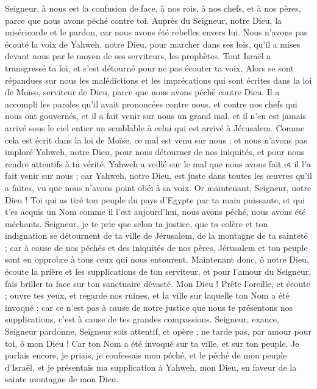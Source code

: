 \begin{multicols}{2}
Seigneur, à nous est la confusion de face, à nos rois, à nos chefs, et à nos pères, parce que nous avons péché contre toi.
Auprès du Seigneur, notre Dieu, la miséricorde et le pardon, car nous avons été rebelles envers lui.
Nous n'avons pas écouté la voix de Yahweh, notre Dieu, pour marcher dans ses lois, qu'il a mises devant nous par le moyen de ses serviteurs, les prophètes.
Tout Israël a transgressé ta loi, et s’est détourné pour ne pas écouter ta voix. Alors se sont répandues sur nous les malédictions et les imprécations qui sont écrites dans la loi de Moïse, serviteur de Dieu, parce que nous avons péché contre Dieu.
Il a accompli les paroles qu'il avait prononcées contre nous, et contre nos chefs qui nous ont gouvernés, et il a fait venir sur nous un grand mal, et il n’en est jamais arrivé sous le ciel entier un semblable à celui qui est arrivé à Jérusalem.
Comme cela est écrit dans la loi de Moïse, ce mal est venu sur nous ; et nous n'avons pas imploré Yahweh, notre Dieu, pour nous détourner de nos iniquités, et pour nous rendre attentifs à ta vérité.
Yahweh a veillé sur le mal que nous avons fait et il l'a fait venir sur nous ; car Yahweh, notre Dieu, est juste dans toutes les œuvres qu'il a faites, vu que nous n'avons point obéi à sa voix.
Or maintenant, Seigneur, notre Dieu ! Toi qui as tiré ton peuple du pays d'Egypte par ta main puissante, et qui t'es acquis un Nom comme il l’est aujourd'hui, nous avons péché, nous avons été méchants.
Seigneur, je te prie que selon ta justice, que ta colère et ton indignation se détournent de ta ville de Jérusalem, de la montagne de ta sainteté ; car à cause de nos péchés et des iniquités de nos pères, Jérusalem et ton peuple sont en opprobre à tous ceux qui nous entourent.
Maintenant donc, ô notre Dieu, écoute la prière et les supplications de ton serviteur, et pour l'amour du Seigneur, fais briller ta face sur ton sanctuaire dévasté.
Mon Dieu ! Prête l'oreille, et écoute ; ouvre tes yeux, et regarde nos ruines, et la ville sur laquelle ton Nom a été invoqué ; car ce n’est pas à cause de notre justice que nous te présentons nos supplications, c’est à cause de tes grandes compassions.
Seigneur, exauce, Seigneur pardonne, Seigneur sois attentif, et opère ; ne tarde pas, par amour pour toi,  ô mon Dieu ! Car ton Nom a été invoqué sur ta ville, et sur ton peuple.
Je parlais encore, je priais, je confessais mon péché, et le péché de mon peuple d'Israël, et je présentais ma supplication à Yahweh, mon Dieu, en faveur de la sainte montagne de mon Dieu.

\end{multicols}
